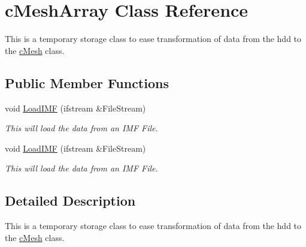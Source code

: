 \hypertarget{classc_mesh_array}{
\section{cMeshArray Class Reference}
\label{classc_mesh_array}
}


This is a temporary storage class to ease transformation of data from the hdd to the \hyperlink{classc_mesh}{cMesh} class.  


\subsection*{Public Member Functions}
\begin{DoxyCompactItemize}
\item 
\hypertarget{classc_mesh_array_adce4a1c4b77569227f23d1e4cc46b4bb}{
void \hyperlink{classc_mesh_array_adce4a1c4b77569227f23d1e4cc46b4bb}{LoadIMF} (ifstream \&FileStream)}
\label{classc_mesh_array_adce4a1c4b77569227f23d1e4cc46b4bb}

\begin{DoxyCompactList}\small\item\em This will load the data from an IMF File. \end{DoxyCompactList}\item 
\hypertarget{classc_mesh_array_adce4a1c4b77569227f23d1e4cc46b4bb}{
void \hyperlink{classc_mesh_array_adce4a1c4b77569227f23d1e4cc46b4bb}{LoadIMF} (ifstream \&FileStream)}
\label{classc_mesh_array_adce4a1c4b77569227f23d1e4cc46b4bb}

\begin{DoxyCompactList}\small\item\em This will load the data from an IMF File. \end{DoxyCompactList}\end{DoxyCompactItemize}


\subsection{Detailed Description}
This is a temporary storage class to ease transformation of data from the hdd to the \hyperlink{classc_mesh}{cMesh} class. 